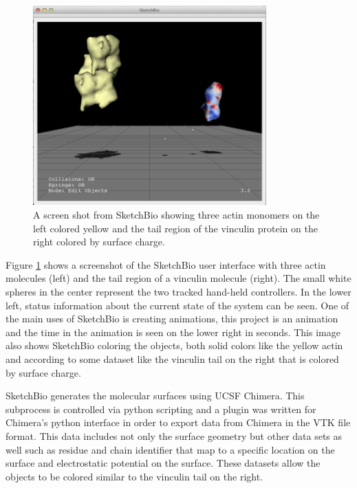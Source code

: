 \documentclass{article} %
\begin{document}
\begin{figure}[t]
\centering
\includegraphics[width=0.8\textwidth]{actinVinculin.png}
\caption{A screen shot from SketchBio showing three actin monomers on the left colored yellow and the tail region of the vinculin protein on the right colored by surface charge.}
\label{fig:actin_vinculin}
\end{figure}

Figure \ref{fig:actin_vinculin} shows a screenshot of the SketchBio user interface with three actin molecules (left) and the tail region of a vinculin molecule (right).  The small white spheres in the center represent the two tracked hand-held controllers.  In the lower left, status information about the current state of the system can be seen.  One of the main uses of SketchBio is creating animations, this project is an animation and the time in the animation is seen on the lower right in seconds.  This image also shows SketchBio coloring the objects, both solid colors like the yellow actin and according to some dataset like the vinculin tail on the right that is colored by surface charge.

SketchBio generates the molecular surfaces using UCSF Chimera.  This subprocess is controlled via python scripting and a plugin was written for Chimera's python interface in order to export data from Chimera in the VTK file format.  This data includes not only the surface geometry but other data sets as well such as residue and chain identifier that map to a specific location on the surface and electrostatic potential on the surface.  These datasets allow the objects to be colored similar to the vinculin tail on the right.
\end{document}
